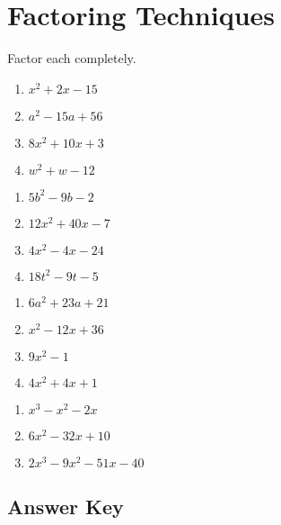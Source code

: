 \chapter{Factoring Techniques}

Factor each completely.

\begin{multicols}{4}
\begin{enumerate}
	\item $x^2 + 2x - 15$
	\item $a^2-15a+56$
	\item $8x^2+10x+3$
	\item $w^2+w-12$
\end{enumerate}	\setcounter{Review}{\value{enumi}}
\end{multicols}
\begin{multicols}{4}
\begin{enumerate}	\setcounter{enumi}{\value{Review}}
	\item $5b^2-9b-2$
	\item $12x^2+40x-7$
	\item $4x^2-4x-24$
    \item $18t^2-9t-5$
\end{enumerate}	\setcounter{Review}{\value{enumi}}
\end{multicols}
\begin{multicols}{4}
\begin{enumerate}	\setcounter{enumi}{\value{Review}}
	\item $6a^2 + 23a + 21$
	\item $x^2-12x+36$
    \item $9x^2-1$
    \item $4x^2+4x+1$
\end{enumerate}	\setcounter{Review}{\value{enumi}}
\end{multicols}
\begin{multicols}{4}
\begin{enumerate}	\setcounter{enumi}{\value{Review}}
	\item $x^3-x^2-2x$
	\item $6x^2-32x+10$
	\item $2x^3-9x^2-51x-40$
\end{enumerate}	\setcounter{Review}{\value{enumi}}
\end{multicols}

\newpage

\section{Answer Key}

